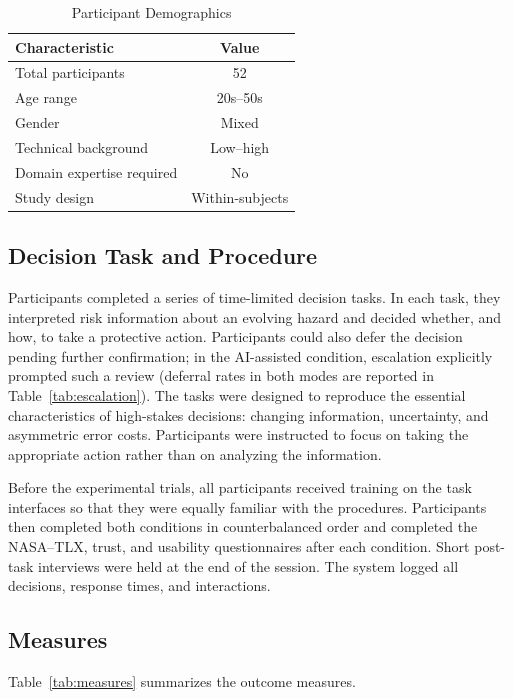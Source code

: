\documentclass[journal]{IEEEtran}
\theoremstyle{plain}
\theoremstyle{definition}
\begin{document}
    \begin{table}[t]
        \caption{Participant Demographics}
        \label{tab:participants}
        \centering
        \begin{tabular}{l c}
            \toprule
            Characteristic & Value \\
            \midrule
            Total participants & 52 \\
            Age range & 20s--50s \\
            Gender & Mixed \\
            Technical background & Low--high \\
            Domain expertise required & No \\
            Study design & Within-subjects \\
            \bottomrule
        \end{tabular}
    \end{table}

    \subsection{Decision Task and Procedure}

    Participants completed a series of time-limited decision tasks. In each task, they interpreted risk information about an evolving hazard and decided whether, and how, to take a protective action. Participants could also defer the decision pending further confirmation; in the AI-assisted condition, escalation explicitly prompted such a review (deferral rates in both modes are reported in Table~\ref{tab:escalation}). The tasks were designed to reproduce the essential characteristics of high-stakes decisions: changing information, uncertainty, and asymmetric error costs. Participants were instructed to focus on taking the appropriate action rather than on analyzing the information.

    Before the experimental trials, all participants received training on the task interfaces so that they were equally familiar with the procedures. Participants then completed both conditions in counterbalanced order and completed the NASA--TLX, trust, and usability questionnaires after each condition. Short post-task interviews were held at the end of the session. The system logged all decisions, response times, and interactions.

    \subsection{Measures}
    \label{sec:measures}
    Table~\ref{tab:measures} summarizes the outcome measures.
\end{document}
